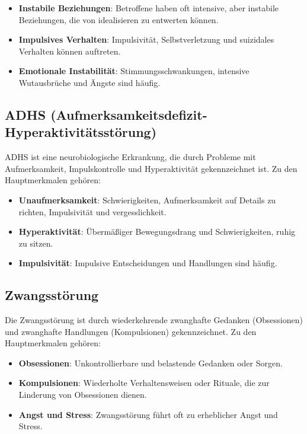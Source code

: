 \begin{itemize}
\item \textbf{Instabile Beziehungen}: Betroffene haben oft intensive, aber instabile Beziehungen, die von idealisieren zu entwerten können.

\item \textbf{Impulsives Verhalten}: Impulsivität, Selbstverletzung und suizidales Verhalten können auftreten.

\item \textbf{Emotionale Instabilität}: Stimmungsschwankungen, intensive Wutausbrüche und Ängste sind häufig.
\end{itemize}

\subsection{ADHS (Aufmerksamkeitsdefizit-Hyperaktivitätsstörung)}

ADHS ist eine neurobiologische Erkrankung, die durch Probleme mit Aufmerksamkeit, Impulskontrolle und Hyperaktivität gekennzeichnet ist. Zu den Hauptmerkmalen gehören:

\begin{itemize}
\item \textbf{Unaufmerksamkeit}: Schwierigkeiten, Aufmerksamkeit auf Details zu richten, Impulsivität und vergesslichkeit.

\item \textbf{Hyperaktivität}: Übermäßiger Bewegungsdrang und Schwierigkeiten, ruhig zu sitzen.

\item \textbf{Impulsivität}: Impulsive Entscheidungen und Handlungen sind häufig.
\end{itemize}

\subsection{Zwangsstörung}

Die Zwangsstörung ist durch wiederkehrende zwanghafte Gedanken (Obsessionen) und zwanghafte Handlungen (Kompulsionen) gekennzeichnet. Zu den Hauptmerkmalen gehören:

\begin{itemize}
\item \textbf{Obsessionen}: Unkontrollierbare und belastende Gedanken oder Sorgen.

\item \textbf{Kompulsionen}: Wiederholte Verhaltensweisen oder Rituale, die zur Linderung von Obsessionen dienen.

\item \textbf{Angst und Stress}: Zwangsstörung führt oft zu erheblicher Angst und Stress.
\end{itemize}

